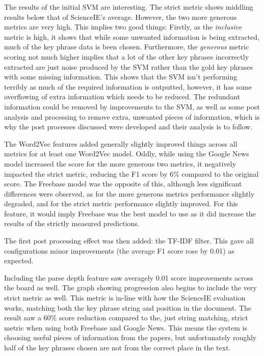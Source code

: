 The results of the initial SVM are interesting. The strict metric shows middling results below that of ScienceIE's average. However, the two more generous metrics are very high. This implies two good things: Firstly, as the \textit{inclusive} metric is high, it shows that while some unwanted information is being extracted, much of the key phrase data is been chosen. Furthermore, the \textit{generous} metric scoring not much higher implies that a lot of the other key phrases incorrectly extracted are just noise produced by the SVM rather than the gold key phrases with some missing information. This shows that the SVM isn't performing terribly as much of the required information is outputted, however, it has some overflowing of extra information which needs to be reduced. The redundant information could be removed by improvements to the SVM, as well as some post analysis and processing to remove extra, unwanted pieces of information, which is why the post processes discussed were developed and their analysis is to follow.

The Word2Vec features added generally slightly improved things across all metrics for at least one Word2Vec model. Oddly, while using the Google News model increased the score for the more generous two metrics, it negatively impacted the strict metric, reducing the F1 score by 6\% compared to the original score. The Freebase model was the opposite of this, although less significant differences were observed, as for the more generous metrics performance slightly degraded, and for the strict metric performance slightly improved. For this feature, it would imply Freebase was the best model to use as it did increase the results of the strictly measured predictions. 

The first post processing effect was then added: the TF-IDF filter. This gave all configurations minor improvements (the average F1 score rose by 0.01) as expected. 

Including the parse depth feature saw averagely 0.01 score improvements across the board as well. The graph showing progression also begins to include the very strict metric as well. This metric is in-line with how the ScienceIE evaluation works, matching both the key phrase string and position in the document. The result saw a 60\% score reduction compared to the, just string matching, strict metric when using both Freebase and Google News. This means the system is choosing useful pieces of information from the papers, but unfortunately roughly half of the key phrases chosen are not from the correct place in the text. 

